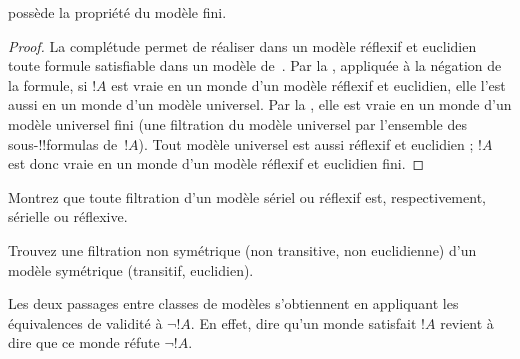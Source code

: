 \documentclass[../../../include/open-logic-section]{subfiles}
\begin{document}
\begin{cor}
   possède la propriété du modèle fini.
\end{cor}

\begin{proof}
  La complétude permet de réaliser dans un modèle réflexif et euclidien toute formule satisfiable dans un modèle de~. Par la , appliquée à la négation de la
  formule, si $!A$ est vraie en un monde
  d'un modèle réflexif et euclidien, elle l'est aussi en un monde d'un
  modèle universel. Par la , elle est vraie en un
  monde d'un modèle universel fini (une filtration du modèle universel
  par l'ensemble des sous-!!{formula}s de~$!A$). Tout modèle
  universel est aussi réflexif et euclidien ; $!A$ est donc vraie en
  un monde d'un modèle réflexif et euclidien fini.
\end{proof}

\begin{prob}
  Montrez que toute filtration d'un modèle sériel ou réflexif est,
  respectivement, sérielle ou réflexive.
\end{prob}

\begin{prob}
  Trouvez une filtration non symétrique (non transitive, non
  euclidienne) d'un modèle symétrique (transitif, euclidien).
\end{prob}
Les deux passages entre classes de modèles s'obtiennent en
appliquant les équivalences de validité à $\lnot !A$.
En effet, dire qu'un monde satisfait $!A$ revient à dire que
ce monde réfute $\lnot !A$.
\end{document}
